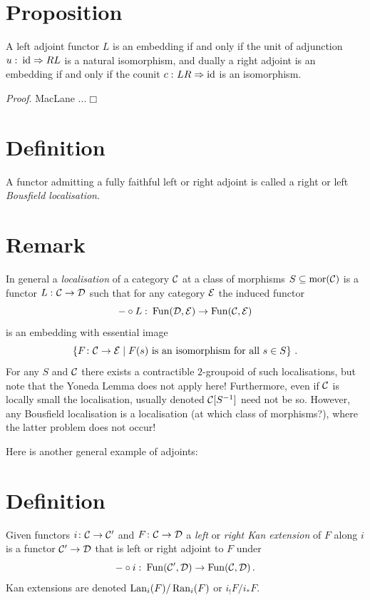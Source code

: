     \section{Proposition}\label{chI-24}
        A left adjoint functor $L$ is an embedding if and only if the unit of adjunction $u \,\colon \operatorname{id} \Rightarrow RL$ is a natural isomorphism, and dually a right adjoint is an embedding if and only if the counit $c \,\colon LR \Rightarrow \operatorname{id}$ is an isomorphism.
        \smallskip
        
        \emph{Proof}. MacLane ...\hfill\(\Box\)
    \section{Definition}
        A functor admitting a fully faithful left or right adjoint is called a right or left \emph{Bousfield localisation}.
    \section{Remark}
        In general a \emph{localisation} of a category $\mathcal{C}$ at a class of morphisms $S \subseteq \operatorname{mor}(\mathcal{C})$ is a functor $L \,\colon \mathcal{C} \to \mathcal{D}$ such that for any category $\mathcal{E}$ the induced functor
        \begin{equation*}
            - \circ L \,\colon \operatorname{Fun}(\mathcal{D}, \mathcal{E}) \to \operatorname{Fun}(\mathcal{C}, \mathcal{E})
        \end{equation*}
        is an embedding with essential image
        \begin{equation*}
            \left\{ F \colon \mathcal{C} \to \mathcal{E} \mid F(s) \text{ is an isomorphism for all } s \in S\right\} \,.
        \end{equation*}
        For any $S$ and $\mathcal{C}$ there exists a contractible $2$-groupoid of such localisations, but note that the Yoneda Lemma does not apply here!
        Furthermore, even if $\mathcal{C}$ is locally small the localisation, usually denoted $\mathcal{C}[S^{-1}]$ need not be so. However, any Bousfield localisation is a localisation (at which class of morphisms?), where the latter problem does not occur!

        Here is another general example of adjoints:
    \section{Definition}
        Given functors $i \colon \mathcal{C} \to \mathcal{C}'$ and $F \colon \mathcal{C} \to \mathcal{D}$ a \emph{left} or \emph{right Kan extension} of $F$ along $i$ is a functor $\mathcal{C}' \to \mathcal{D}$ that is left or right adjoint to $F$ under
        \begin{equation*}
            - \circ i \,\colon \operatorname{Fun}(\mathcal{C}', \mathcal{D}) \to \operatorname{Fun}(\mathcal{C}, \mathcal{D}) \,.
        \end{equation*}
        Kan extensions are denoted $\operatorname{Lan}_i(F) / \operatorname{Ran}_i(F)$ or $i_!F / i_*F$.

